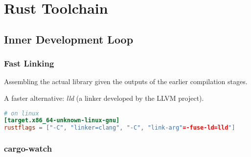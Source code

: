 \chapter{Rust Toolchain}
\section{Inner Development Loop}
\subsection{Fast Linking}
\begin{definition}[linking]
	Assembling the actual library given the outputs of the earlier compilation 
	stages.
\end{definition}

A faster alternative: \emph{lld} (a linker developed by the LLVM project).

\begin{lstlisting}[language=toml]
# on linux
[target.x86_64-unknown-linux-gnu]
rustflags = ["-C", "linker=clang", "-C", "link-arg"=-fuse-ld=lld"]
\end{lstlisting}

\subsection{cargo-watch}

